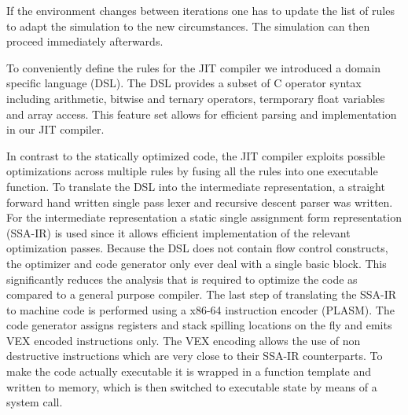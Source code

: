 If the environment changes between iterations one has to update the list of rules to adapt the simulation to the new circumstances.
The simulation can then proceed immediately afterwards.

To conveniently define the rules for the JIT compiler we introduced a domain specific language (DSL). The DSL provides a subset of C operator syntax including arithmetic, bitwise and ternary operators, termporary float variables and array access. This feature set allows for efficient parsing and implementation in our JIT compiler.

In contrast to the statically optimized code, the JIT compiler exploits possible optimizations across multiple rules by fusing all the rules into one executable function. %
To translate the DSL into the intermediate representation, a straight forward hand written single pass lexer and recursive descent parser was written. %
For the intermediate representation a static single assignment form representation (SSA-IR)\cite[Chapter~6.2.4]{dragon}\cite{LuaJITir} is used since it allows efficient implementation of the relevant optimization passes. Because the DSL does not contain flow control constructs, the optimizer and code generator only ever deal with a single basic block. This significantly reduces the analysis that is required to optimize the code as compared to a general purpose compiler. The last step of translating the SSA-IR to machine code is performed using a x86-64 instruction encoder (PLASM). The code generator assigns registers and stack spilling locations on the fly and emits VEX encoded instructions only. The VEX encoding allows the use of non destructive instructions which are very close to their SSA-IR counterparts. To make the code actually executable it is wrapped in a function template and written to memory, which is then switched to executable state by means of a system call.


